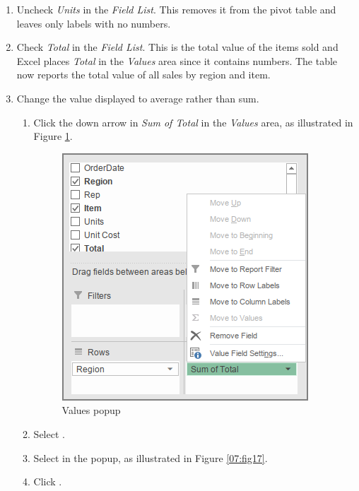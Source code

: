 \begin{enumbox}
\begin{enumerate}
		\item Uncheck \textit{Units} in the \textit{Field List}. This removes it from the pivot table and leaves only labels with no numbers.
		\item Check \textit{Total} in the \textit{Field List}. This is the total value of the items sold and Excel places \textit{Total} in the \textit{Values} area since it contains numbers. The table now reports the total value of all sales by region and item.
		\item Change the value displayed to average rather than sum.
	
		\begin{enumerate}
			\item Click the down arrow in \textit{Sum of Total} in the \textit{Values} area, as illustrated in Figure \ref{07:fig16}.
	
			\begin{figure}[H]
				\centering
				\includegraphics[width=\maxwidth{.75\linewidth}]{gfx/ch07_fig16}
				\caption{Values popup}
				\label{07:fig16}
			\end{figure}
	
			\item Select .
			\item Select  in the popup, as illustrated in Figure \ref{07:fig17}.
			\item Click .
		\end{enumerate}
	

\end{enumerate}
\end{enumbox}
